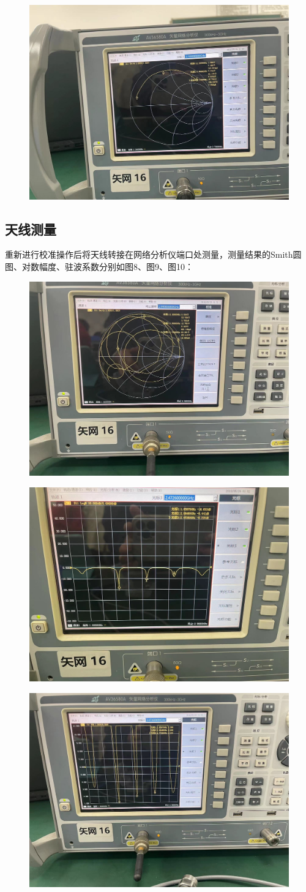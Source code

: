 \documentclass{source/Report}
\begin{document}
\begin{figure}[H]
    \begin{center}
        \includegraphics[width=0.4\linewidth]{pic/cb1_p7.jpg}
        \caption{}
    \end{center}
\end{figure}
\subsection{天线测量}
重新进行校准操作后将天线转接在网络分析仪端口处测量，测量结果的Smith圆图、对数幅度、驻波系数分别如图8、图9、图10：
\begin{figure}[H]
    \begin{center}
        \includegraphics[width=0.35\linewidth]{pic/cb1_p8.jpg}
        \caption{}
    \end{center}
\end{figure}
\begin{figure}[H]
    \begin{center}
        \includegraphics[width=0.35\linewidth]{pic/cb1_p9.jpg}
        \caption{}
    \end{center}
\end{figure}
\begin{figure}[H]
    \begin{center}
        \includegraphics[width=0.4\linewidth]{pic/cb1_p10.jpg}
        \caption{}
    \end{center}
\end{figure}
\end{document}
